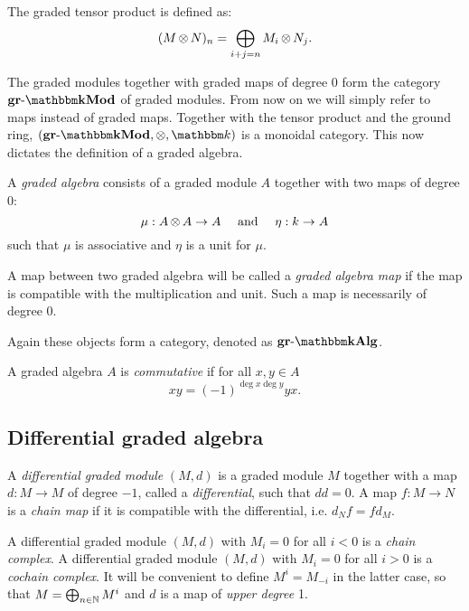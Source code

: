 \begin{definition}
	The graded tensor product is defined as:
	$$ (M \operatorname*{\otimes} N)_n = \bigoplus_{i + j = n} M_i \operatorname*{\otimes} N_j. $$
\end{definition}

The graded modules together with graded maps of degree $0$ form the category $\grMod{\k}$ of graded modules. From now on we will simply refer to maps instead of graded maps. Together with the tensor product and the ground ring, $(\grMod{\k}, \tensor, \k)$ is a monoidal category. This now dictates the definition of a graded algebra.

\begin{definition}
	A \emph{graded algebra} consists of a graded module $A$ together with two maps of degree $0$:
	$$ \mu: A \operatorname*{\otimes} A \to A \quad\text{ and }\quad \eta: k \to A $$
	such that $\mu$ is associative and $\eta$ is a unit for $\mu$.

	A map between two graded algebra will be called a \emph{graded algebra map} if the map is compatible with the multiplication and unit. Such a map is necessarily of degree $0$.
\end{definition}

Again these objects form a category, denoted as $\grAlg{\k}$.

\begin{definition}
	A graded algebra $A$ is \emph{commutative} if for all $x, y \in A$
	$$ xy = (-1)^{\deg{x}\deg{y}} yx. $$
\end{definition}



\subsection{Differential graded algebra}

\begin{definition}
	A \emph{differential graded module} $(M, d)$ is a graded module $M$ together with a map $d: M \to M$ of degree $-1$, called a \emph{differential}, such that $dd = 0$. A map $f: M \to N$ is a \emph{chain map} if it is compatible with the differential, i.e. $d_N f = f d_M$.
\end{definition}

A differential graded module $(M, d)$ with $M_i = 0$ for all $i < 0$ is a \emph{chain complex}. A differential graded module $(M, d)$ with $M_i = 0$ for all $i > 0$ is a \emph{cochain complex}. It will be convenient to define $M^i = M_{-i}$ in the latter case, so that $M = \bigoplus_{n \in \mathbb{N}} M^i$ and $d$ is a map of \emph{upper degree} 1.

